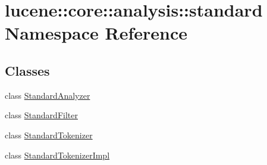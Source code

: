 \hypertarget{namespacelucene_1_1core_1_1analysis_1_1standard}{}\section{lucene\+:\+:core\+:\+:analysis\+:\+:standard Namespace Reference}
\label{namespacelucene_1_1core_1_1analysis_1_1standard}
\subsection*{Classes}
\begin{DoxyCompactItemize}
\item 
class \mbox{\hyperlink{classlucene_1_1core_1_1analysis_1_1standard_1_1StandardAnalyzer}{Standard\+Analyzer}}
\item 
class \mbox{\hyperlink{classlucene_1_1core_1_1analysis_1_1standard_1_1StandardFilter}{Standard\+Filter}}
\item 
class \mbox{\hyperlink{classlucene_1_1core_1_1analysis_1_1standard_1_1StandardTokenizer}{Standard\+Tokenizer}}
\item 
class \mbox{\hyperlink{classlucene_1_1core_1_1analysis_1_1standard_1_1StandardTokenizerImpl}{Standard\+Tokenizer\+Impl}}
\end{DoxyCompactItemize}
